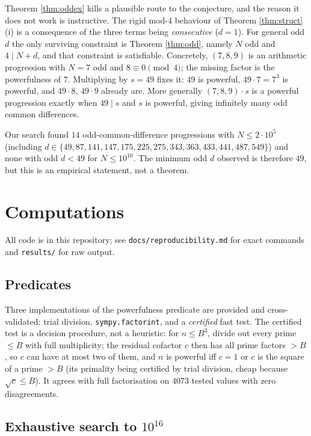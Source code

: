 \documentclass[11pt]{article}
\theoremstyle{definition}
\begin{document}
\begin{remark}\label{rem:why-odd-d}
Theorem \ref{thm:oddex} kills a plausible route to the conjecture, and the reason it
does not work is instructive. The rigid mod-$4$ behaviour of Theorem
\ref{thm:struct}(i) is a consequence of the three terms being \emph{consecutive}
($d=1$). For general odd $d$ the only surviving constraint is Theorem \ref{thm:odd},
namely $N$ odd and $4\mid N+d$, and that constraint is satisfiable. Concretely,
$(7,8,9)$ is an arithmetic progression with $N=7$ odd and $8\equiv0\pmod4$; the
missing factor is the powerfulness of $7$. Multiplying by $s=49$ fixes it: $49$ is
powerful, $49\cdot7=7^3$ is powerful, and $49\cdot 8$, $49\cdot 9$ already are.
More generally $(7,8,9)\cdot s$ is a powerful progression exactly when $49\mid s$ and
$s$ is powerful, giving infinitely many odd common differences.
\end{remark}

Our search found $14$ odd-common-difference progressions with $N\le2\cdot10^5$
(including $d\in\{49,87,141,147,175,225,275,343,363,433,441,487,549\}$) and none
with odd $d<49$ for $N\le10^{10}$. The minimum odd $d$ observed is therefore $49$,
but this is an empirical statement, not a theorem.

\section{Computations}\label{sec:comp}

All code is in this repository; see \texttt{docs/reproducibility.md} for exact
commands and \texttt{results/} for raw output.

\subsection{Predicates}

Three implementations of the powerfulness predicate are provided and
cross-validated: trial division, \texttt{sympy.factorint}, and a \emph{certified}
fast test. The certified test is a decision procedure, not a heuristic: for
$n\le B^3$, divide out every prime $\le B$ with full multiplicity; the residual
cofactor $c$ then has all prime factors $>B$, so $c$ can have at most two of them,
and $n$ is powerful iff $c=1$ or $c$ is the square of a prime $>B$ (its primality
being certified by trial division, cheap because $\sqrt c\le B$). It agrees with
full factorisation on $4073$ tested values with zero disagreements.

\subsection{Exhaustive search to $10^{16}$}\label{sec:scale}
\end{document}
